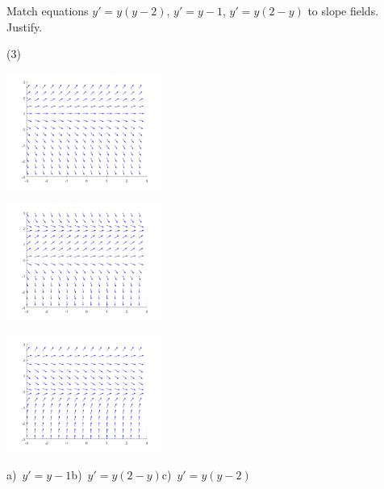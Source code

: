 \begin{exercise}
Match equations $y'=y(y-2)$, $y'=y-1$, $y' = y(2-y)$ to slope fields.
Justify.
\begin{tasks}(3)
\task
\parbox[c]{1.75in}{\includegraphics[width=2in]{Images/quivym1}}
\task
\parbox[c]{1.75in}{\includegraphics[width=2in]{Images/quivy2my}}
\task
\parbox[c]{1.75in}{\includegraphics[width=2in]{Images/quivyym2}}
\end{tasks}
\end{exercise}
\comboSol{%
}
{%
a)~$y'=y-1$\quad b)~$y'=y(2-y)$\quad c)~$y'=y(y-2)$
}

